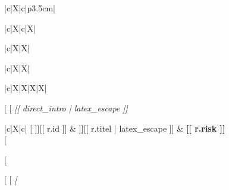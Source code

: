 {{{{\begin{xltabular}{\textwidth}{|c|X|c|p{3.5cm}|}
{{{{{{{{\begin{xltabular}{\textwidth}{|c|X|c|X|}
{{\begin{xltabular}{\textwidth}{|c|X|X|}
{\begin{xltabular}{\textwidth}{|c|X|X|}
\begin{xltabular}{\textwidth}{|c|X|X|X|X|}
{[%
[%
\footnotesize\emph{[[ direct_intro | latex_escape ]]}\normalsize
\begin{xltabular}{\textwidth}{|c|X|c|}
  \hline
  [%
  \hline
  \endhead
{}\endfoot
\endlastfoot
[%
  \hyperref[bev:[[ r.id ]]]{[[ r.id ]]} & \hyperref[bev:[[ r.id ]]]{[[ r.titel | latex_escape ]]} & \cellcolor{[[ r.color ]]}\textbf{\textcolor{[[ r.fg ]]}{[[ r.risk ]]}} \\
  \hline
[%
\end{xltabular}
[%

[%
[%
\footnotesize\emph{[%
\ibgauge{[[ impact_gauge['gauge_angle'] ]]}{[[ impact_gauge['index'] ]]\%}{[[ impact_gauge['index_label'] | latex_escape ]]}{[%
[%

}}}
\end{xltabular}
\end{xltabular}}
\end{xltabular}}}
\end{xltabular}}}}}}}}}
\end{xltabular}}}}}
